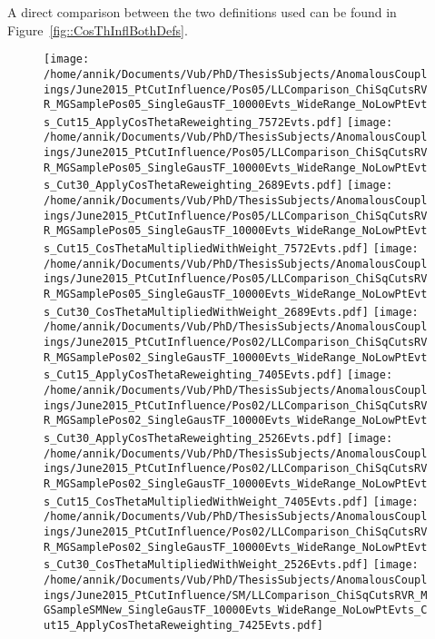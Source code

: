 A direct comparison between the two definitions used can be found in Figure~\ref{fig::CosThInflBothDefs}.
\begin{figure}[h!t]
 \centering
 \texttt{[image: /home/annik/Documents/Vub/PhD/ThesisSubjects/AnomalousCouplings/June2015\_PtCutInfluence/Pos05/LLComparison\_ChiSqCutsRVR\_MGSamplePos05\_SingleGausTF\_10000Evts\_WideRange\_NoLowPtEvts\_Cut15\_ApplyCosThetaReweighting\_7572Evts.pdf]}
 \texttt{[image: /home/annik/Documents/Vub/PhD/ThesisSubjects/AnomalousCouplings/June2015\_PtCutInfluence/Pos05/LLComparison\_ChiSqCutsRVR\_MGSamplePos05\_SingleGausTF\_10000Evts\_WideRange\_NoLowPtEvts\_Cut30\_ApplyCosThetaReweighting\_2689Evts.pdf]}
 \texttt{[image: /home/annik/Documents/Vub/PhD/ThesisSubjects/AnomalousCouplings/June2015\_PtCutInfluence/Pos05/LLComparison\_ChiSqCutsRVR\_MGSamplePos05\_SingleGausTF\_10000Evts\_WideRange\_NoLowPtEvts\_Cut15\_CosThetaMultipliedWithWeight\_7572Evts.pdf]}
 \texttt{[image: /home/annik/Documents/Vub/PhD/ThesisSubjects/AnomalousCouplings/June2015\_PtCutInfluence/Pos05/LLComparison\_ChiSqCutsRVR\_MGSamplePos05\_SingleGausTF\_10000Evts\_WideRange\_NoLowPtEvts\_Cut30\_CosThetaMultipliedWithWeight\_2689Evts.pdf]}
 \texttt{[image: /home/annik/Documents/Vub/PhD/ThesisSubjects/AnomalousCouplings/June2015\_PtCutInfluence/Pos02/LLComparison\_ChiSqCutsRVR\_MGSamplePos02\_SingleGausTF\_10000Evts\_WideRange\_NoLowPtEvts\_Cut15\_ApplyCosThetaReweighting\_7405Evts.pdf]}
 \texttt{[image: /home/annik/Documents/Vub/PhD/ThesisSubjects/AnomalousCouplings/June2015\_PtCutInfluence/Pos02/LLComparison\_ChiSqCutsRVR\_MGSamplePos02\_SingleGausTF\_10000Evts\_WideRange\_NoLowPtEvts\_Cut30\_ApplyCosThetaReweighting\_2526Evts.pdf]}
 \texttt{[image: /home/annik/Documents/Vub/PhD/ThesisSubjects/AnomalousCouplings/June2015\_PtCutInfluence/Pos02/LLComparison\_ChiSqCutsRVR\_MGSamplePos02\_SingleGausTF\_10000Evts\_WideRange\_NoLowPtEvts\_Cut15\_CosThetaMultipliedWithWeight\_7405Evts.pdf]}
 \texttt{[image: /home/annik/Documents/Vub/PhD/ThesisSubjects/AnomalousCouplings/June2015\_PtCutInfluence/Pos02/LLComparison\_ChiSqCutsRVR\_MGSamplePos02\_SingleGausTF\_10000Evts\_WideRange\_NoLowPtEvts\_Cut30\_CosThetaMultipliedWithWeight\_2526Evts.pdf]}
 \texttt{[image: /home/annik/Documents/Vub/PhD/ThesisSubjects/AnomalousCouplings/June2015\_PtCutInfluence/SM/LLComparison\_ChiSqCutsRVR\_MGSampleSMNew\_SingleGausTF\_10000Evts\_WideRange\_NoLowPtEvts\_Cut15\_ApplyCosThetaReweighting\_7425Evts.pdf]}

\end{figure}
